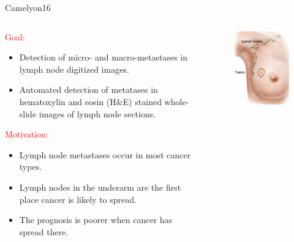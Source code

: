 \documentclass{beamer}
\begin{document}
\begin{frame}[noframenumbering]{Camelyon16}

\begin{columns}[T] %
\begin{column}{.50\textwidth}
\begin{small}
\textcolor{red}{Goal:}
\begin{itemize}
\item Detection of micro- and macro-metastases in lymph node digitized images.
\item Automated detection of metatases in hematoxylin and eosin (H\&E) stained whole-slide images of lymph node sections.
\end{itemize}
\textcolor{red}{Motivation:}
\begin{itemize}
\item Lymph node metastases occur in most cancer types.
\item Lymph nodes in the underarm are the first place cancer is likely to spread.
\item The prognosis is poorer when cancer has spread there.
\end{itemize}
\end{small}
\end{column}%
\hfill%
\begin{column}{.50\textwidth}
\begin{figure}[!ht]
\centering
\includegraphics[width=\textwidth]{Booby.png}
\label{booby}
\end{figure}
\end{column}%
\end{columns}


\end{frame}
\end{document}
